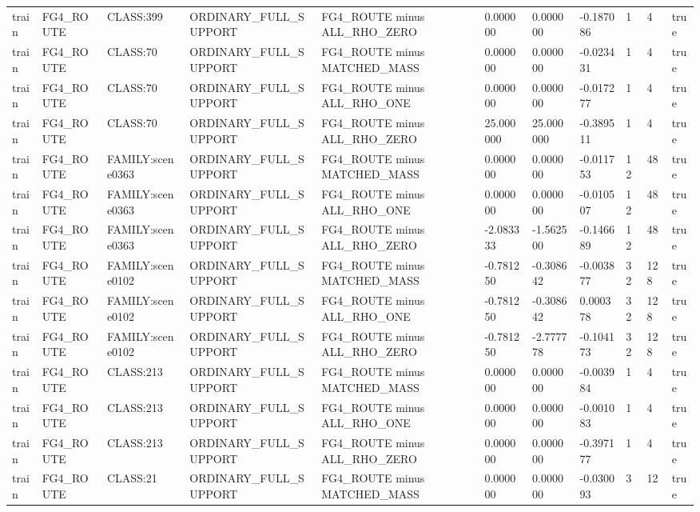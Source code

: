 \begin{tabular}{lllllllllll}
train & FG4\_ROUTE & CLASS:399 & ORDINARY\_FULL\_SUPPORT & FG4\_ROUTE minus ALL\_RHO\_ZERO & 0.000000 & 0.000000 & -0.187086 & 1 & 4 & true \\
train & FG4\_ROUTE & CLASS:70 & ORDINARY\_FULL\_SUPPORT & FG4\_ROUTE minus MATCHED\_MASS & 0.000000 & 0.000000 & -0.023431 & 1 & 4 & true \\
train & FG4\_ROUTE & CLASS:70 & ORDINARY\_FULL\_SUPPORT & FG4\_ROUTE minus ALL\_RHO\_ONE & 0.000000 & 0.000000 & -0.017277 & 1 & 4 & true \\
train & FG4\_ROUTE & CLASS:70 & ORDINARY\_FULL\_SUPPORT & FG4\_ROUTE minus ALL\_RHO\_ZERO & 25.000000 & 25.000000 & -0.389511 & 1 & 4 & true \\
train & FG4\_ROUTE & FAMILY:scene0363 & ORDINARY\_FULL\_SUPPORT & FG4\_ROUTE minus MATCHED\_MASS & 0.000000 & 0.000000 & -0.011753 & 12 & 48 & true \\
train & FG4\_ROUTE & FAMILY:scene0363 & ORDINARY\_FULL\_SUPPORT & FG4\_ROUTE minus ALL\_RHO\_ONE & 0.000000 & 0.000000 & -0.010507 & 12 & 48 & true \\
train & FG4\_ROUTE & FAMILY:scene0363 & ORDINARY\_FULL\_SUPPORT & FG4\_ROUTE minus ALL\_RHO\_ZERO & -2.083333 & -1.562500 & -0.146689 & 12 & 48 & true \\
train & FG4\_ROUTE & FAMILY:scene0102 & ORDINARY\_FULL\_SUPPORT & FG4\_ROUTE minus MATCHED\_MASS & -0.781250 & -0.308642 & -0.003877 & 32 & 128 & true \\
train & FG4\_ROUTE & FAMILY:scene0102 & ORDINARY\_FULL\_SUPPORT & FG4\_ROUTE minus ALL\_RHO\_ONE & -0.781250 & -0.308642 & 0.000378 & 32 & 128 & true \\
train & FG4\_ROUTE & FAMILY:scene0102 & ORDINARY\_FULL\_SUPPORT & FG4\_ROUTE minus ALL\_RHO\_ZERO & -0.781250 & -2.777778 & -0.104173 & 32 & 128 & true \\
train & FG4\_ROUTE & CLASS:213 & ORDINARY\_FULL\_SUPPORT & FG4\_ROUTE minus MATCHED\_MASS & 0.000000 & 0.000000 & -0.003984 & 1 & 4 & true \\
train & FG4\_ROUTE & CLASS:213 & ORDINARY\_FULL\_SUPPORT & FG4\_ROUTE minus ALL\_RHO\_ONE & 0.000000 & 0.000000 & -0.001083 & 1 & 4 & true \\
train & FG4\_ROUTE & CLASS:213 & ORDINARY\_FULL\_SUPPORT & FG4\_ROUTE minus ALL\_RHO\_ZERO & 0.000000 & 0.000000 & -0.397177 & 1 & 4 & true \\
train & FG4\_ROUTE & CLASS:21 & ORDINARY\_FULL\_SUPPORT & FG4\_ROUTE minus MATCHED\_MASS & 0.000000 & 0.000000 & -0.030093 & 3 & 12 & true \\

\end{tabular}
